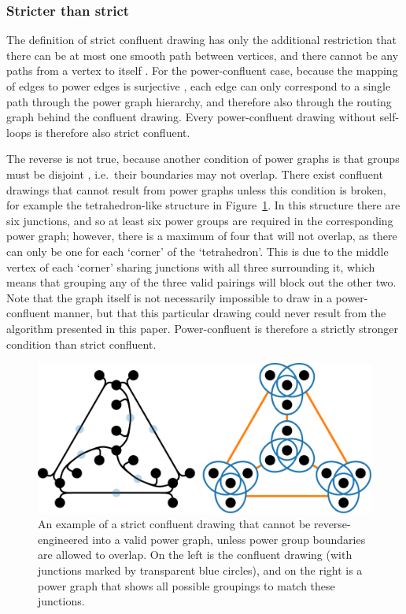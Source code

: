 \subsubsection{Stricter than strict}
The definition of strict confluent drawing has only the additional restriction that there can be at most one smooth path between vertices, and there cannot be any paths from a vertex to itself \cite{Eppstein2013}. 
For the power-confluent case, because the mapping of edges to power edges is surjective \cite{Royer2008}, each edge can only correspond to a single path through the power graph hierarchy, and therefore also through the routing graph behind the confluent drawing. Every power-confluent drawing without self-loops is therefore also strict confluent.

The reverse is not true, because another condition of power graphs is that groups must be disjoint \cite{Royer2008}, i.e.\ their boundaries may not overlap.
There exist confluent drawings that cannot result from power graphs unless this condition is broken, for example the tetrahedron-like structure in Figure~\ref{fig:strict}.
In this structure there are six junctions, and so at least six power groups are required in the corresponding power graph; however, there is a maximum of four that will not overlap, as there can only be one for each `corner' of the `tetrahedron'. This is due to the middle vertex of each `corner' sharing junctions with all three surrounding it, which means that grouping any of the three valid pairings will block out the other two.
Note that the graph itself is not necessarily impossible to draw in a power-confluent manner, but that this particular drawing could never result from the algorithm presented in this paper.
Power-confluent is therefore a strictly stronger condition than strict confluent.

\begin{figure}
  \centering
  \includegraphics[width=\linewidth]{power/stricter.pdf}
  \caption[A strict confluent drawing that is not power-confluent]{An example of a strict confluent drawing that cannot be reverse-engineered into a valid power graph, unless power group boundaries are allowed to overlap. On the left is the confluent drawing (with junctions marked by transparent blue circles), and on the right is a power graph that shows all possible groupings to match these junctions.}
  \label{fig:strict}
\end{figure}


